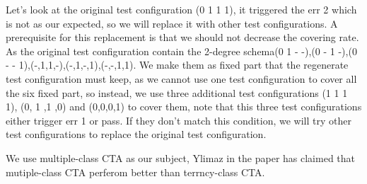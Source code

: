 \documentclass{sig-alternate}
\begin{document}
Let's look at the original test configuration (0 1 1 1), it triggered the err 2 which is not as our expected, so we will replace it with other test configurations. A prerequisite for this replacement is that we should not decrease the covering rate. As the original test configuration contain the 2-degree schema(0 1 - -),(0 - 1 -),(0 - - 1),(-,1,1,-),(-,1,-,1),(-,-,1,1). We make them as fixed part that the regenerate test configuration must keep, as we cannot use one test configuration to cover all the six fixed part, so instead,  we use three additional test configurations (1 1 1 1), (0, 1 ,1 ,0) and (0,0,0,1) to cover them, note that this three test configurations either trigger err 1 or pass. If they don't match this condition, we will try other test configurations to replace the original test configuration.

We use multiple-class CTA as our subject, Ylimaz in the paper has claimed that mutiple-class CTA perferom better than terrncy-class CTA.
\end{document}
